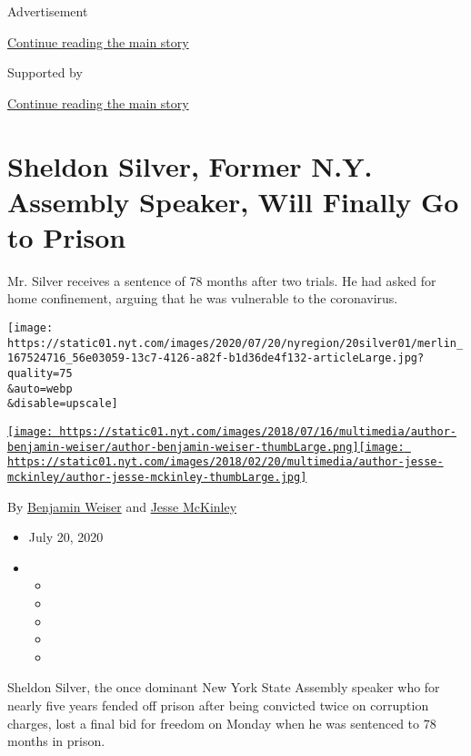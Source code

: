 Advertisement

\protect\hyperlink{after-top}{Continue reading the main story}

Supported by

\protect\hyperlink{after-sponsor}{Continue reading the main story}

\hypertarget{sheldon-silver-former-ny-assembly-speaker-will-finally-go-to-prison}{%
\section{Sheldon Silver, Former N.Y. Assembly Speaker, Will Finally Go
to
Prison}\label{sheldon-silver-former-ny-assembly-speaker-will-finally-go-to-prison}}

Mr. Silver receives a sentence of 78 months after two trials. He had
asked for home confinement, arguing that he was vulnerable to the
coronavirus.

\texttt{[image: https://static01.nyt.com/images/2020/07/20/nyregion/20silver01/merlin\_167524716\_56e03059-13c7-4126-a82f-b1d36de4f132-articleLarge.jpg?quality=75\\\&auto=webp\\\&disable=upscale]}

\href{https://www.nytimes.com/by/benjamin-weiser}{\texttt{[image: https://static01.nyt.com/images/2018/07/16/multimedia/author-benjamin-weiser/author-benjamin-weiser-thumbLarge.png]}}\href{https://www.nytimes.com/by/jesse-mckinley}{\texttt{[image: https://static01.nyt.com/images/2018/02/20/multimedia/author-jesse-mckinley/author-jesse-mckinley-thumbLarge.jpg]}}

By \href{https://www.nytimes.com/by/benjamin-weiser}{Benjamin Weiser}
and \href{https://www.nytimes.com/by/jesse-mckinley}{Jesse McKinley}

\begin{itemize}
\item
  July 20, 2020
\item
  \begin{itemize}
  \item
  \item
  \item
  \item
  \item
  \end{itemize}
\end{itemize}

Sheldon Silver, the once dominant New York State Assembly speaker who
for nearly five years fended off prison after being convicted twice on
corruption charges, lost a final bid for freedom on Monday when he was
sentenced to 78 months in prison.

